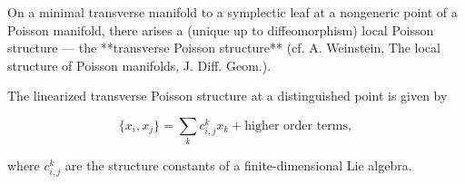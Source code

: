 On a minimal transverse manifold to a symplectic leaf at a nongeneric point of a Poisson manifold, there arises a (unique up to diffeomorphism) local Poisson structure — the **transverse Poisson structure** (cf. A. Weinstein, The local structure of Poisson manifolds, J. Diff. Geom.).

The linearized transverse Poisson structure at a distinguished point is given by

$$\{x_i, x_j\} = \sum_k c_{i,j}^k x_k + \text{higher order terms},$$

where $c_{i,j}^k$ are the structure constants of a finite-dimensional Lie algebra.
